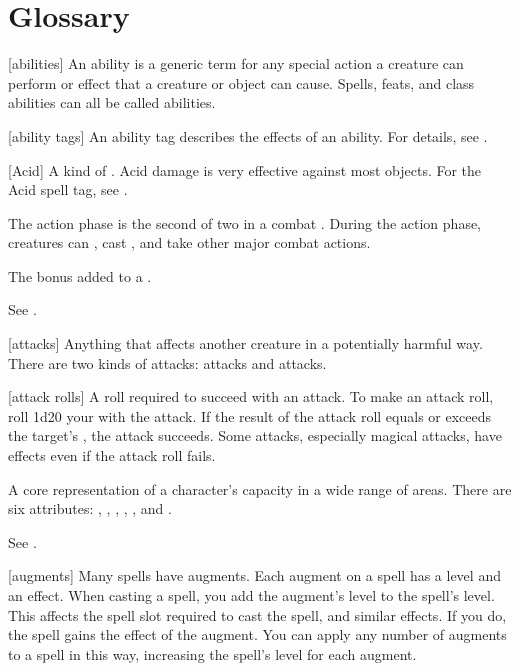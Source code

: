 \chapter{Glossary}\label{Glossary}

[abilities] An ability is a generic term for any special action a creature can perform or effect that a creature or object can cause. Spells, feats, and class abilities can all be called abilities.

[ability tags] An ability tag describes the effects of an ability.
For details, see .

[Acid] A kind of . Acid damage is very effective against most objects. For the Acid spell tag, see .

 The action phase is the second of two  in a combat .
During the action phase, creatures can , cast , and take other major combat actions.

 The bonus added to a .

 See .

[attacks] Anything that affects another creature in a potentially harmful way. There are two kinds of attacks:  attacks and  attacks.

[attack rolls] A roll required to succeed with an attack.
To make an attack roll, roll 1d20 \add your  with the attack.
If the result of the attack roll equals or exceeds the target's , the attack succeeds.
Some attacks, especially magical attacks, have effects even if the attack roll fails.

 A core representation of a character's capacity in a wide range of areas. There are six attributes: , , , , , and .

 See .

[augments] Many spells have augments.
Each augment on a spell has a level and an effect.
When casting a spell, you add the augment's level to the spell's level.
This affects the spell slot required to cast the spell, and similar effects.
If you do, the spell gains the effect of the augment.
You can apply any number of augments to a spell in this way, increasing the spell's level for each augment.

